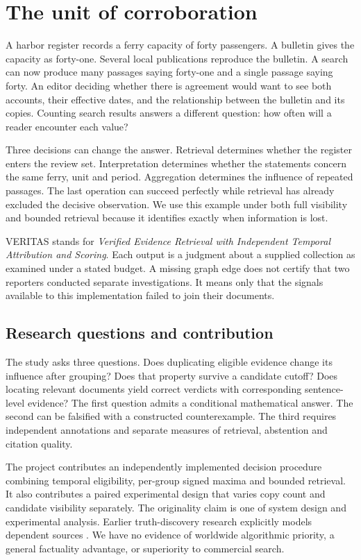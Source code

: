 \section{The unit of corroboration}
A harbor register records a ferry capacity of forty passengers. A bulletin gives the capacity as forty-one. Several local publications reproduce the bulletin. A search can now produce many passages saying forty-one and a single passage saying forty. An editor deciding whether there is agreement would want to see both accounts, their effective dates, and the relationship between the bulletin and its copies. Counting search results answers a different question: how often will a reader encounter each value?

Three decisions can change the answer. Retrieval determines whether the register enters the review set. Interpretation determines whether the statements concern the same ferry, unit and period. Aggregation determines the influence of repeated passages. The last operation can succeed perfectly while retrieval has already excluded the decisive observation. We use this example under both full visibility and bounded retrieval because it identifies exactly when information is lost.

VERITAS stands for \emph{Verified Evidence Retrieval with Independent Temporal Attribution and Scoring}. Each output is a judgment about a supplied collection as examined under a stated budget. A missing graph edge does not certify that two reporters conducted separate investigations. It means only that the signals available to this implementation failed to join their documents.

\subsection{Research questions and contribution}
The study asks three questions. Does duplicating eligible evidence change its influence after grouping? Does that property survive a candidate cutoff? Does locating relevant documents yield correct verdicts with corresponding sentence-level evidence? The first question admits a conditional mathematical answer. The second can be falsified with a constructed counterexample. The third requires independent annotations and separate measures of retrieval, abstention and citation quality.

The project contributes an independently implemented decision procedure combining temporal eligibility, per-group signed maxima and bounded retrieval. It also contributes a paired experimental design that varies copy count and candidate visibility separately. The originality claim is one of system design and experimental analysis. Earlier truth-discovery research explicitly models dependent sources \cite{Dependence}. We have no evidence of worldwide algorithmic priority, a general factuality advantage, or superiority to commercial search.

